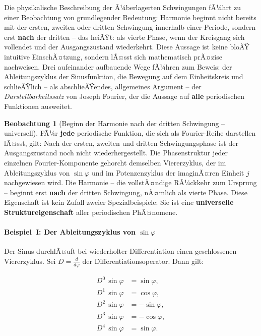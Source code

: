 ﻿\documentclass[a4paper,12pt]{article}
\theoremstyle{definition}
\newtheorem{observation}{Beobachtung}[section]
\begin{document}
Die physikalische Beschreibung der Ã¼berlagerten Schwingungen fÃ¼hrt zu einer Beobachtung
von grundlegender Bedeutung: Harmonie beginnt nicht bereits mit der ersten, zweiten oder
dritten Schwingung innerhalb einer Periode, sondern erst \textbf{nach} der dritten --
das heiÃŸt: als vierte Phase, wenn der Kreisgang sich vollendet und der Ausgangszustand
wiederkehrt. Diese Aussage ist keine bloÃŸ intuitive EinschÃ¤tzung, sondern lÃ¤sst sich
mathematisch prÃ¤zise nachweisen. Drei aufeinander aufbauende Wege fÃ¼hren zum Beweis:
der Ableitungszyklus der Sinusfunktion, die Bewegung auf dem Einheitskreis und
schlieÃŸlich -- als abschlieÃŸendes, allgemeines Argument -- der
\textit{Darstellbarkeitssatz} von Joseph Fourier, der die Aussage auf
\textbf{alle} periodischen Funktionen ausweitet.

\begin{observation}[Beginn der Harmonie nach der dritten Schwingung -- universell]
	FÃ¼r \textbf{jede} periodische Funktion, die sich als Fourier-Reihe darstellen
	lÃ¤sst, gilt: Nach der ersten, zweiten und dritten Schwingungsphase ist der
	Ausgangszustand noch nicht wiederhergestellt. Die Phasenstruktur jeder einzelnen
	Fourier-Komponente gehorcht demselben Viererzyklus, der im Ableitungszyklus von
	$\sin\varphi$ und im Potenzenzyklus der imaginÃ¤ren Einheit $j$ nachgewiesen wird.
	Die Harmonie -- die vollstÃ¤ndige RÃ¼ckkehr zum Ursprung -- beginnt erst
	\textbf{nach} der dritten Schwingung, nÃ¤mlich als vierte Phase. Diese Eigenschaft
	ist kein Zufall zweier Spezialbeispiele: Sie ist eine \textbf{universelle
	Struktureigenschaft} aller periodischen PhÃ¤nomene.
\end{observation}

\paragraph{Beispiel~I: Der Ableitungszyklus von $\sin\varphi$}

Der Sinus durchlÃ¤uft bei wiederholter Differentiation einen geschlossenen Viererzyklus.
Sei $D = \tfrac{d}{d\varphi}$ der Differentiationsoperator. Dann gilt:

\begin{align*}
	D^0\,\sin\varphi &= \sin\varphi, \\
	D^1\,\sin\varphi &= \cos\varphi, \\
	D^2\,\sin\varphi &= -\sin\varphi, \\
	D^3\,\sin\varphi &= -\cos\varphi, \\
	D^4\,\sin\varphi &= \sin\varphi.
\end{align*}
\end{document}
